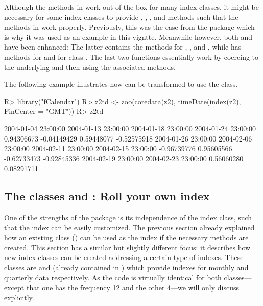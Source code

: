 \documentclass[article,nojss]{jss}
\begin{document}
Although the methods in  work out of the box for many index classes,
it might be necessary for some index classes to provide , , \code{[},
 and  methods such that the methods in  
work properly. Previously, this was the case  from the  package
which is why it was used as an example in this vigntte. 
Meanwhile however, both  and 
have been enhanced: The latter contains the methods for , , and \code{[},
while  has methods for  and  for class .
The last two functions essentially work by coercing to the underlying  and then
using the associated methods.

The following example illustrates how  can be transformed
to use the  class.
\begin{Schunk}
\begin{Sinput}
R> library("fCalendar")
R> z2td <- zoo(coredata(z2), timeDate(index(z2), FinCenter = "GMT"))
R> z2td
\end{Sinput}
\begin{Soutput}
2004-01-04 23:00:00 2004-01-13 23:00:00 2004-01-18 23:00:00 2004-01-24 23:00:00 
         0.94306673         -0.04149429          0.59448077         -0.52575918 
2004-01-26 23:00:00 2004-02-06 23:00:00 2004-02-11 23:00:00 2004-02-15 23:00:00 
        -0.96739776          0.95605566         -0.62733473         -0.92845336 
2004-02-19 23:00:00 2004-02-23 23:00:00 
         0.56060280          0.08291711 
\end{Soutput}
\end{Schunk}

\subsection[The classes "yearmon" and "yearqtr": Roll your own index]{The classes  and : Roll your own index}
\label{sec:yearmon}

One of the strengths of the  package is its independence of the
index class, such that the index can be easily customized. The previous section
already explained how an existing class () can be used as
the index if the necessary methods are created. This section has a similar
but slightly different focus: it describes how new index classes can be created
addressing a certain type of indexes. These classes are  and
 (already contained in ) which provide indexes for
monthly and quarterly data respectively.
As the code is virtually identical for both classes---except that one has the 
frequency 12 and the other 4---we will only discuss  explicitly.
\end{document}

